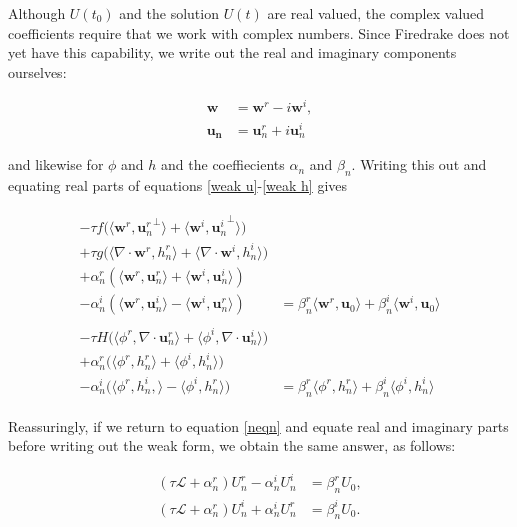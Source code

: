 \documentclass[14pt]{article}
\def\MM#1{\boldsymbol{#1}}
\begin{document}
Although $U(t_0)$ and the solution $U(t)$ are real valued, the complex
valued coefficients require that we work with complex numbers. Since
Firedrake does not yet have this capability, we write out the real and
imaginary components ourselves:

\begin{align}
  \MM{w} &= \MM{w}^r - i\MM{w}^i, \\
  \MM{u_n} &= \MM{u}_n^r + i\MM{u}_n^i
\end{align}

\noindent and likewise for $\phi$ and $h$ and the coeffiecients
$\alpha_n$ and $\beta_n$. Writing this out and equating real parts of
equations \ref{weak u}-\ref{weak h} gives

\begin{align}
  \begin{split}
    -\tau f\big(\langle\MM{w}^r, {\MM{u}_n^r}^\perp\rangle + \langle\MM{w}^i, {\MM{u}_n^i}^\perp\rangle\big) \\
  + \tau g\big(\langle\nabla\cdot\MM{w}^r, h_n^r\rangle + \langle\nabla\cdot\MM{w}^i, h_n^i\rangle\big) \\
  + \alpha_n^r(\langle\MM{w}^r, \MM{u}_n^r\rangle + \langle\MM{w}^i, \MM{u}_n^i\rangle) \\
  - \alpha_n^i(\langle\MM{w}^r, \MM{u}_n^i\rangle - \langle\MM{w}^i, \MM{u}_n^r\rangle) &= \beta_n^r\langle\MM{w}^r, \MM{u}_0\rangle + \beta_n^i\langle\MM{w}^i, \MM{u}_0\rangle
  \end{split}\\
  \begin{split}
    -\tau H \big(\langle\phi^r, \nabla\cdot\MM{u}_n^r\rangle + \langle\phi^i, \nabla\cdot\MM{u}_n^i\rangle\big) \\
    +\alpha_n^r\big(\langle\phi^r, h_n^r\rangle + \langle\phi^i, h_n^i\rangle\big) \\
    -\alpha_n^i\big(\langle\phi^r, h_n^i,\rangle - \langle\phi^i, h_n^r\rangle\big) &= \beta_n^r\langle\phi^r, h_n^r\rangle + \beta_n^i\langle\phi^i, h_n^i\rangle
  \end{split}
\end{align}

Reassuringly, if we return to equation \ref{neqn} and equate real and
imaginary parts before writing out the weak form, we obtain the same
answer, as follows:

\begin{align}
  (\tau\mathcal{L} + \alpha_n^r)U_n^r - \alpha_n^iU_n^i &= \beta_n^rU_0, \\
  (\tau\mathcal{L} + \alpha_n^r)U_n^i + \alpha_n^iU_n^r & = \beta_n^iU_0.
\end{align}
\end{document}

